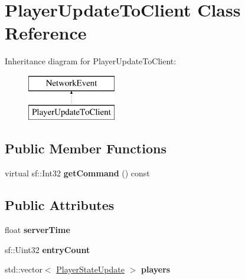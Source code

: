 \hypertarget{class_player_update_to_client}{\section{Player\-Update\-To\-Client Class Reference}
\label{class_player_update_to_client}
}
Inheritance diagram for Player\-Update\-To\-Client\-:\begin{figure}[H]
\begin{center}
\leavevmode
\includegraphics[height=2.000000cm]{class_player_update_to_client}
\end{center}
\end{figure}
\subsection*{Public Member Functions}
\begin{DoxyCompactItemize}
\item 
\hypertarget{class_player_update_to_client_ad712b93f45274f211505baf1280d3e9d}{virtual sf\-::\-Int32 {\bfseries get\-Command} () const }\label{class_player_update_to_client_ad712b93f45274f211505baf1280d3e9d}

\end{DoxyCompactItemize}
\subsection*{Public Attributes}
\begin{DoxyCompactItemize}
\item 
\hypertarget{class_player_update_to_client_a9966a1fa7568a2ecdf9d8f320cb0df94}{float {\bfseries server\-Time}}\label{class_player_update_to_client_a9966a1fa7568a2ecdf9d8f320cb0df94}

\item 
\hypertarget{class_player_update_to_client_a2fd273dcefa40ee10cead19bbf1cfc27}{sf\-::\-Uint32 {\bfseries entry\-Count}}\label{class_player_update_to_client_a2fd273dcefa40ee10cead19bbf1cfc27}

\item 
\hypertarget{class_player_update_to_client_a38b8e97d764d26b4a13f3dea93beec7f}{std\-::vector$<$ \hyperlink{class_player_state_update}{Player\-State\-Update} $>$ {\bfseries players}}\label{class_player_update_to_client_a38b8e97d764d26b4a13f3dea93beec7f}

\end{DoxyCompactItemize}
